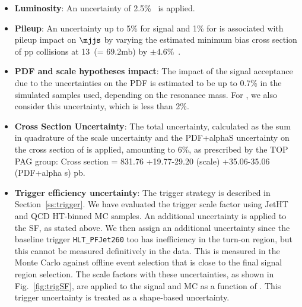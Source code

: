 \begin{itemize}

\item \textbf{Luminosity}: An uncertainty of 2.5\%~\cite{CMS-PAS-LUM-17-001} is applied.

\item \textbf{Pileup}: An uncertainty up to 5\% for signal and 1\% for \ttbar is associated with pileup impact on $\mjjs$ by varying the estimated minimum bias cross section of pp collisions at 13~\TeV (= 69.2\unit{mb}) by $\pm 4.6\%$~\cite{PileupTWiki}.

\item \textbf{PDF and scale hypotheses impact}: The impact of the signal acceptance due to the uncertainties on the PDF is estimated to be up to 0.7\% in the simulated samples used, depending on the resonance mass. For \ttbar, we also consider this uncertainty, which is less than 2\%.

\item \textbf{\ttbar Cross Section Uncertainty}: The total uncertainty, calculated as the sum in quadrature of the scale uncertainty and the PDF+alphaS uncertainty on the cross section of \ttbar is applied, amounting to 6\%, as prescribed by the TOP PAG group: Cross section = 831.76 +19.77-29.20 (scale) +35.06-35.06 (PDF+alpha s) pb. 

\item \textbf{Trigger efficiency uncertainty}: The trigger strategy is described in Section~\ref{ss:trigger}. We have evaluated the trigger scale factor using JetHT and QCD HT-binned MC samples. An additional uncertainty is applied to the SF, as stated above. We then assign an additional uncertainty since the baseline trigger \texttt{HLT\_PFJet260} too has inefficiency in the turn-on region, but this cannot be measured definitively in the data. This is measured in the Monte Carlo against offline event selection that is close to the final signal region selection. The scale factors with these uncertainties, as shown in Fig.~\ref{fig:trigSF}, are applied to the signal and \ttbar MC as a function of \mjjs. This trigger uncertainty is treated as a shape-based uncertainty.
  

\end{itemize}
